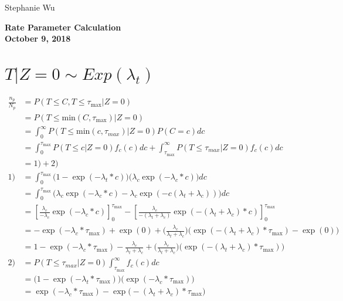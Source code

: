 \documentclass[10pt, letter]{article}
\begin{document}
\begin{flushleft}
\large{Stephanie Wu}
\end{flushleft}
\begin{center}
\large\textbf{Rate Parameter Calculation\\
October 9, 2018\\}
\end{center}

\section{$T|Z=0 \sim Exp(\lambda_t)$}
\begin{align*}
\frac{n_p}{N_p} &= P(T \leqslant C, T \leqslant \tau_\mathrm{max} | Z=0)\\
&= P(T \leqslant \mathrm{min}(C, \tau_\mathrm{max}) | Z=0) \\
&= \int_0^\infty P(T \leqslant \mathrm{min}(c, \tau_{max}) | Z=0) P(C=c) dc\\
&= \int_0^{\tau_\mathrm{max}} P(T \leqslant c | Z=0) f_c(c)dc +  \int_{\tau_{\mathrm{max}}}^\infty P(T \leqslant \tau_{max}| Z=0) f_c (c) dc\\
&= 1) + 2)\\
1) &= \int_0^{\tau_{\mathrm{max}}} \big( 1 - \exp(-\lambda_t * c)\big) \big(\lambda_c \exp(-\lambda_c * c)\big)dc\\
&= \int_0^{\tau_{\mathrm{max}}} \Big( \lambda_c \exp(-\lambda_c * c) - \lambda_c \exp(-c(\lambda_t + \lambda_c)) \Big) dc\\
&= \left[ \frac{\lambda_c}{-\lambda_c} \exp(-\lambda_c * c)\right]_0^{\tau_\mathrm{max}} - \left[\frac{\lambda_c}{-(\lambda_t + \lambda_c)} \exp(-(\lambda_t + \lambda_c )*c)\right]_0^{\tau_\mathrm{max}}\\
&= -\exp(-\lambda_c * \tau_\mathrm{max}) + \exp(0) + \Big(\frac{\lambda_c}{\lambda_t + \lambda_c}\Big)\Big(\exp(-(\lambda_t+\lambda_c)*\tau_\mathrm{max}) - \exp(0)\Big)\\
&= 1 - \exp(-\lambda_c * \tau_\mathrm{max}) - \frac{\lambda_c}{\lambda_t + \lambda_c} + \Big(\frac{\lambda_c}{\lambda_t + \lambda_c}\Big)\Big(\exp(-(\lambda_t+\lambda_c)*\tau_\mathrm{max})\Big)\\
2) &=  P(T \leqslant \tau_{max}| Z=0) \int_{\tau_{\mathrm{max}}}^\infty f_c(c)dc\\
&= \Big(1-\exp(-\lambda_t*\tau_\mathrm{max})\Big)\Big(\exp(-\lambda_c*\tau_\mathrm{max})\Big)\\
&= \exp(-\lambda_c*\tau_\mathrm{max}) - \exp\big(-(\lambda_t + \lambda_c)*\tau_\mathrm{max}\big)\\

\end{align*}
\end{document}
